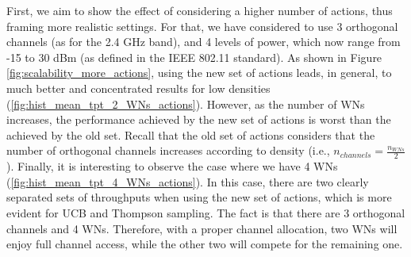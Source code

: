 \documentclass[preprint,12pt]{article}
\begin{document}
First, we aim to show the effect of considering a higher number of actions, thus framing more realistic settings. For that, we have considered to use 3 orthogonal channels (as for the 2.4 GHz band), and 4 levels of power, which now range from -15 to 30 dBm (as defined in the IEEE 802.11 standard). As shown in Figure \ref{fig:scalability_more_actions}, using the new set of actions leads, in general, to much better and concentrated results for low densities (\ref{fig:hist_mean_tpt_2_WNs_actions}). However, as the number of WNs increases, the performance achieved by the new set of actions is worst than the achieved by the old set. Recall that the old set of actions considers that the number of orthogonal channels increases according to density (i.e., $n_{channels} = \frac{n_{WNs}}{2}$). Finally, it is interesting to observe the case where we have 4 WNs (\ref{fig:hist_mean_tpt_4_WNs_actions}). In this case, there are two clearly separated sets of throughputs when using the new set of actions, which is more evident for UCB and Thompson sampling. The fact is that there are 3 orthogonal channels and 4 WNs. Therefore, with a proper channel allocation, two WNs will enjoy full channel access, while the other two will compete for the remaining one.
\end{document}
